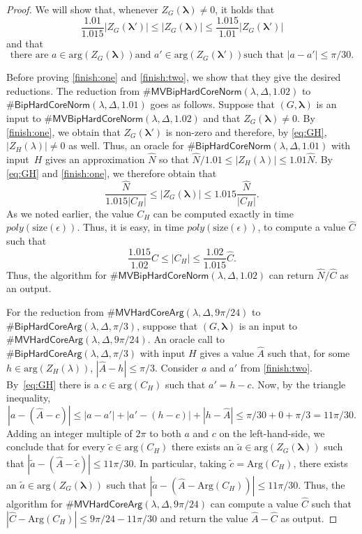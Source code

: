 \documentclass[11pt]{article}
\renewcommand\arg{\text{arg}}
\newcommand\Arg{\text{Arg}}
\newcommand{\size}[1]{\mathrm{size}(#1)}
\def\lambdab{\ensuremath{\boldsymbol{\lambda}}}
\def\FactorHardCore#1{\#\ensuremath{\mathsf{BipHardCoreNorm}(\lambda,\Delta,#1)}}
\def\FactorMVBipHardCore#1{\#\ensuremath{\mathsf{MVBipHardCoreNorm}(\lambda,\Delta,#1)}}
\def\ArgHardCore#1{\#\ensuremath{\mathsf{BipHardCoreArg}(\lambda,\Delta,#1)}}
\def\ArgMVHardCore#1{\#\ensuremath{\mathsf{MVHardCoreArg}(\lambda,\Delta,#1)}}
\newcommand{\eps}{\epsilon}
\begin{document}
\begin{proof}
We will show that, whenever $Z_G(\lambdab)\neq 0$, it holds that
\begin{equation}
\label{finish:one}
\frac{1.01}{1.015} 
|Z_G(\lambdab')|
\leq 
|Z_G(\lambdab)|
\leq \frac{1.015}{1.01}
|Z_G(\lambdab')|
\end{equation}
and that
\begin{equation}
\label{finish:two}
\mbox{there are 
$a \in \arg(Z_G(\lambdab))$
and 
$a' \in \arg(Z_G(\lambdab'))$
such that $|a-a'|
  \leq \pi/30$.}
\end{equation}

Before proving  \eqref{finish:one} and \eqref{finish:two}, we show that they give the desired reductions. 
The reduction from $\FactorMVBipHardCore{1.02}$ to
$\FactorHardCore{1.01}$  goes as follows.
Suppose that $(G,\lambdab)$ is an input to 
$\FactorMVBipHardCore{1.02}$ and that
 $Z_G(\lambdab)\neq 0$. By \eqref{finish:one}, we obtain  that $Z_G(\lambdab')$ is non-zero and  therefore, by \eqref{eq:GH}, $|Z_H(\lambda)| \neq 0$ as well. Thus,
 an oracle for 
$\FactorHardCore{1.01}$ 
with input~$H$
gives an approximation $\hat{N}$
so that 
$\hat{N}/1.01 \leq |Z_H(\lambda)| \leq 1.01 \hat{N}$. By \eqref{eq:GH} and \eqref{finish:one}, we therefore obtain that
$$
\frac{\hat{N} }{1.015 |C_H|}
\leq |Z_G(\lambdab)| 
\leq 1.015 \frac{\hat{N}}{|C_H|}.$$
As we noted earlier, 
  the value $C_H$ can be computed exactly 
 in time $poly(\size{\eps})$.  
 Thus, it is easy, in time $poly(\size{\eps})$,
 to compute a value $\hat{C}$ such that
 $$
\frac{1.015}{1.02}\hat{C} \leq  {|C_H|} \leq \frac{1.02  }{1.015 }\hat{C}.$$
Thus, the algorithm for $\FactorMVBipHardCore{1.02}$
can return $\hat{N}/\hat{C}$ as an output.

For the reduction from 
$\ArgMVHardCore{9\pi/24}$ to 
$\ArgHardCore{\pi/3}$, suppose   that $(G,\lambdab)$ is an input to 
 $\ArgMVHardCore{9\pi/24}$.
 An oracle call to  $\ArgHardCore{\pi/3}$
 with input $H$ gives a value $\hat{A}$ such that, for some $h\in \arg(Z_H(\lambda))$,
   $|\hat{A}-h| \leq \pi/3$.
Consider $a$ and $a'$ from \eqref{finish:two}.
 By~\eqref{eq:GH} there is a 
 $c\in \arg(C_H)$ such that $a'=h-c$.
 Now, by the triangle inequality, 
 $$|a - (\hat{A}-c)| \leq |a-a'| + |a'-(h-c)| + |h-\hat{A}| \leq \pi/30 + 0 +  \pi/3 =  11 \pi/30.$$
 Adding
 an integer multiple of $2  \pi$ to both $a$ and $c$ on the
 left-hand-side, we conclude that 
 for every $\tilde{c}\in \arg(C_H)$
 there exists an $\tilde{a} \in \arg(Z_G(\lambdab))$
 such that
 $|\tilde{a} - (\hat{A} - \tilde{c})| \leq 11 \pi/30$. 
 In particular,
 taking $\tilde{c} = \Arg(C_H)$,
  there exists an $\tilde{a} \in \arg(Z_G(\lambdab))$
 such that
 $|\tilde{a} - (\hat{A} -  \Arg(C_H))| \leq 11 \pi/30$.  
 Thus, 
   the algorithm for   $\ArgMVHardCore{9\pi/24}$   can compute a value $\hat{C}$ such that
 $|\hat{C} - \Arg(C_H)| \leq 9 \pi/24 - 11\pi/30$
 and return the value $\hat{A} - \hat{C}$ as output.
    

\end{proof}
\end{document}
